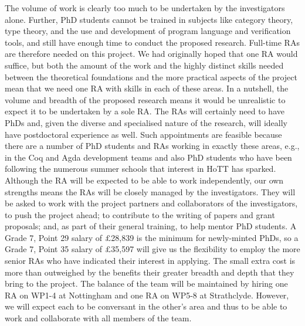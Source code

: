 \documentclass[a4paper,11pt]{article}
\begin{document}
 The volume of work is clearly too much to be
undertaken by the investigators alone. Further, PhD students cannot be
trained in subjects like category theory, type theory, and the use and
development of program language and verification tools, and still have
enough time to conduct the proposed research. Full-time RAs are
therefore needed on this project. We had originally hoped that one RA
would suffice, but both the amount of the work and the highly distinct
skills needed between the theoretical foundations and the more
practical aspects of the project mean that we need one RA with skills
in each of these areas. In a nutshell, the volume and breadth of the
proposed research means it would be unrealistic to expect it to be
undertaken by a sole RA. The RAs will certainly need to have PhDs and,
given the diverse and specialised nature of the research, will ideally
have postdoctoral experience as well.  Such appointments are feasible
because there are a number of PhD students and RAs working in exactly
these areas, e.g., in the Coq and Agda development teams and also PhD
students who have been following the numerous summer schools that
interest in HoTT has sparked.  Although the RA will be expected to be
able to work independently, our own strengths means the RAs will be
closely managed by the investigators. They will be asked to work with
the project partners and collaborators of the investigators, to push
the project ahead; to contribute to the writing of papers and grant
proposals; and, as part of their general training, to help mentor PhD
students. A Grade 7, Point 29 salary of $\pounds$28,839 is the minimum
for newly-minted PhDs, so a Grade 7, Point 35 salary of
$\pounds$35,597 will give us the flexibility to employ the more senior
RAs who have indicated their interest in applying. The small extra
cost is more than outweighed by the benefits their greater breadth and
depth that they bring to the project. The balance of the team will be
maintained by hiring one RA on WP1-4 at Nottingham and one RA on WP5-8
at Strathclyde. However, we will expect each to be conversant in the
other's area and thus to be able to work and collaborate with all
members of the team.

\end{document}
